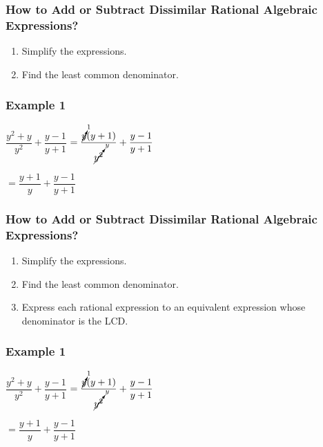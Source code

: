 \documentclass[14pt]{beamer}
\begin{document}
    \begin{frame}
    	\frametitle{How to Add or Subtract Dissimilar Rational Algebraic Expressions?}
    	\begin{enumerate}
    		\item Simplify the expressions.
    		\item Find the least common denominator. 
    	\end{enumerate}
    \end{frame}

    \begin{frame}
    	\frametitle{Example 1}
    	$\dfrac{y^2+y}{y^2} + \dfrac{y-1}{y+1}$
    	$ = \dfrac{\cancelto{1}{y} (y + 1) }{\cancelto{y}{y^2}} + \dfrac{y-1}{y+1}$
    	
    	\vspace{1em}\hspace{1em} $ = \dfrac{y+1}{y} + \dfrac{y-1}{y+1} $
    	
     \end{frame}

    \begin{frame}
    	\frametitle{How to Add or Subtract Dissimilar Rational Algebraic Expressions?}
    	\begin{enumerate}
    		\item Simplify the expressions.
    		\item Find the least common denominator. 
    		\item Express each rational expression to an equivalent expression whose denominator is the LCD.
    	\end{enumerate}
    \end{frame}

    \begin{frame}
    	\frametitle{Example 1}
    	$\dfrac{y^2+y}{y^2} + \dfrac{y-1}{y+1}$
    	$ = \dfrac{\cancelto{1}{y} (y + 1) }{\cancelto{y}{y^2}} + \dfrac{y-1}{y+1}$
    	
    	\vspace{1em}\hspace{1em} $ = \dfrac{y+1}{y} + \dfrac{y-1}{y+1} $
    	
    \end{frame}
\end{document}
